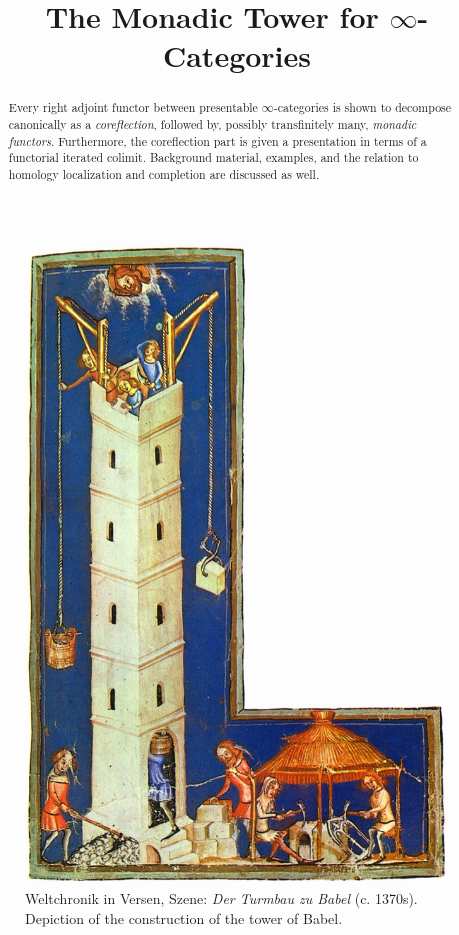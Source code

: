 \documentclass[12pt]{article}
\begin{document}
\title{The Monadic Tower for $\infty$-Categories}
\maketitle

\begin{abstract}
    Every right adjoint functor between presentable $\infty$-categories is shown to decompose canonically as a \textit{coreflection}, followed by, possibly transfinitely many,  \textit{monadic functors}. Furthermore, the coreflection part is given a presentation in terms of a functorial iterated colimit.  Background material, examples, and the relation to homology localization and completion are discussed as well. 
\end{abstract}

\begin{figure}[H]
    \centering{}
    \includegraphics[scale=0.129]{Meister_der_Weltenchronik.jpg}
    \caption*{Weltchronik in Versen, Szene: \textit{Der Turmbau zu Babel} (c. 1370s). Depiction of the construction of the tower of Babel.}
\end{figure}
\end{document}
